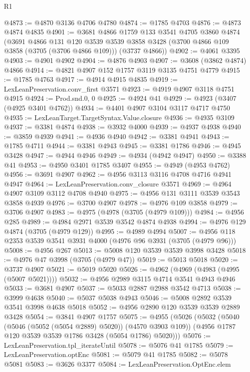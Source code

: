 \begin{lexlean}{R1}
\begin{coremodule}
@4873 := @4870 @3136 @4706 @4780
@4874 := @1785 @4703
@4876 := @4873 @4874 @4835
@4901 := @3681
    @4866
    @1759
    @133
    @3541
    @4705
    @3860
    @4874
    (@3691
      @4866
      @131
      @120
      @3539
      @3539
      @3858
      @3428
      (@3700 @4866 @109 @3858 (@3705 (@3706 @4866 @109)))
      (@3737 @4866))
@4902 := @4061 @3395
@4903 := @4901 @4902
@4904 := @4876 @4903
@4907 := @3608 (@3862 @4874) @4866
@4914 := @4821 @4907 @152 @1757 @3119 @3135 @4751 @4779
@4915 := @1785 @4763
@4917 := @4914 @4915 @4835
@4919 := LexLeanPreservation.conv_first @3571
@4923 := @4919 @4907 @3118 @4751 @4915
@4924 := Prod.snd.{0, 0}
@4925 := @4924 @41
@4929 := @4923 (@3407 (@4925 @3401 @4762))
@4934 := @4401 @4907 @3104 @3117 @4717 @4750
@4935 := LexLeanTarget.TargetSyntax.Value.closure
@4936 := @4935 @3109
@4937 := @3381 @4874
@4938 := @3932 @4000
@4939 := @4937 @4938
@4940 := @3859 @4939
@4941 := @4936 @4940
@4942 := @3381 @4941
@4943 := @1785 @4711
@4944 := @3381 @4943
@4945 := @3381 @1786
@4946 := @4945 @3428
@4947 := @4944 @4946
@4949 := @4934 (@4942 @4947)
@4950 := @3388 @41
@4953 := @4950 @3401 @1785 @3407
@4955 := @4949 (@4953 @4762)
@4956 := @3691 @4907
@4962 := @4956 @3113 @3116 @4708 @4716 @4941 @4947
@4964 := LexLeanPreservation.conv_closure @3571
@4969 := @4964 @4907 @3109 @3112 @4708 @4940
@4975 := @4956 @131 @3111 @3539 @3543 @3858 @4939
@4976 := @3700 @4907
@4978 := @4976 @109 @3858
@4979 := @3706 @4907
@4983 := @4975 (@4978 (@3705 (@4979 @109)))
@4984 := @4956 @285
@4989 := @4984 @2971 @3539 @3542 @4874 @4938
@4994 := @4976 @129 @4874 (@3705 (@4979 @129))
@4995 := @4989 @4994
@5007 := @4956 @118 @2353 @3539 @3541 @3931 @4000 (@4976 @96 @3931 (@3705 (@4979 @96)))
@5008 := @4956 @267
@5013 := @5008 @120 @3539 @3539 @3998 @3428
@5018 := @4976 @47 @3998 (@3705 (@4979 @47))
@5019 := @5013 @5018
@5020 := @3737 @4907
@5021 := @5019 @5020
@5026 := @4962 (@4969 (@4983 (@4995 (@5007 @5021))))
@5032 := @4956 @2989 @3115 @4714 @3541 @4943 @4946
@5033 := @3681 @4907
@5037 := @5033 @2887 @2988 @3542 @4713
@5038 := @3999 @4638
@5040 := @5037 @5038 @4943
@5046 := @5008 @2892 @3539 @3541 @3998 @4638 @5018
@5052 := @4956 @2890 @120 @3539 @3539 @2889 @3428
@5054 := @3841 @4907 @1757
@5075 := @4955
    (@5026
      (@5032
        (@5040 (@5046 (@5052 (@5054 @2889) @5020)) (@4570 @3903 @109))
        (@4956 @1787 @120 @3539 @3539 @1786 @3428 (@5054 @1786) @5020)))
@5076 := LexLeanPreservation.tpl_iterateUntil
@5078 := @5076 @41 @1785
@5079 := LexLeanPreservation.optEnc
@5081 := @5079 @41 @1785
@5082 := @5078 @5081
@5083 := @3626 @3377
@5084 := LexLeanPreservation.OptEnc.elem

\end{coremodule}
\end{lexlean}
